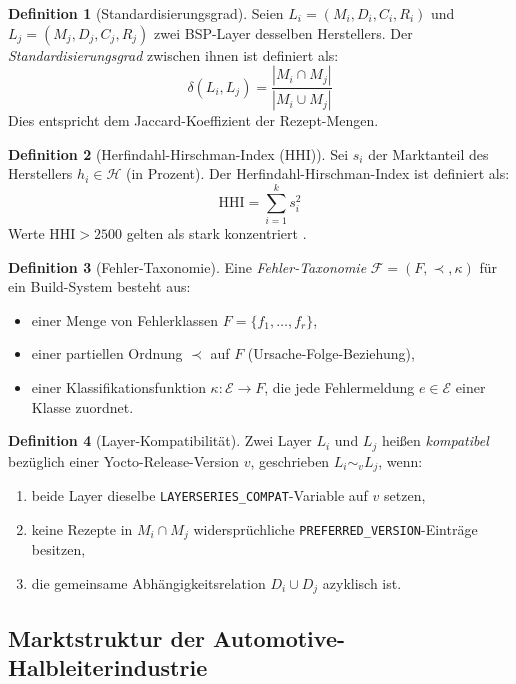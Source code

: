 ﻿\documentclass[a4paper,12pt]{article}
\theoremstyle{definition}
\newtheorem{definition}{Definition}
\begin{document}
\begin{definition}[Standardisierungsgrad]
	Seien $L_i = (M_i, D_i, C_i, R_i)$ und $L_j = (M_j, D_j, C_j, R_j)$ zwei BSP-Layer
	desselben Herstellers. Der \emph{Standardisierungsgrad} zwischen ihnen ist definiert als:
	\[
	\delta(L_i, L_j) = \frac{|M_i \cap M_j|}{|M_i \cup M_j|}
	\]
	Dies entspricht dem Jaccard-Koeffizient der Rezept-Mengen.
\end{definition}

\begin{definition}[Herfindahl-Hirschman-Index (HHI)]
	Sei $s_i$ der Marktanteil des Herstellers $h_i \in \mathcal{H}$ (in Prozent).
	Der Herfindahl-Hirschman-Index ist definiert als:
	\[
	\mathrm{HHI} = \sum_{i=1}^{k} s_i^2
	\]
	Werte $\mathrm{HHI} > 2500$ gelten als stark konzentriert \cite{doj2010}.
\end{definition}

\begin{definition}[Fehler-Taxonomie]
	Eine \emph{Fehler-Taxonomie} $\mathcal{F} = (F, \prec, \kappa)$ für ein Build-System besteht aus:
	\begin{itemize}
		\item einer Menge von Fehlerklassen $F = \{f_1, \ldots, f_r\}$,
		\item einer partiellen Ordnung $\prec$ auf $F$ (Ursache-Folge-Beziehung),
		\item einer Klassifikationsfunktion $\kappa: \mathcal{E} \to F$,
		      die jede Fehlermeldung $e \in \mathcal{E}$ einer Klasse zuordnet.
	\end{itemize}
\end{definition}

\begin{definition}[Layer-Kompatibilität]
	Zwei Layer $L_i$ und $L_j$ heißen \emph{kompatibel} bezüglich einer
	Yocto-Release-Version $v$, geschrieben $L_i \sim_v L_j$, wenn:
	\begin{enumerate}
		\item beide Layer dieselbe \texttt{LAYERSERIES\_COMPAT}-Variable auf $v$ setzen,
		\item keine Rezepte in $M_i \cap M_j$ widersprüchliche \texttt{PREFERRED\_VERSION}-Einträge besitzen,
		\item die gemeinsame Abhängigkeitsrelation $D_i \cup D_j$ azyklisch ist.
	\end{enumerate}
\end{definition}

\subsection{Marktstruktur der Automotive-Halbleiterindustrie}
\end{document}
